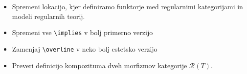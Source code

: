 \documentclass[a4paper]{article}
\begin{document}
    \begin{itemize}
        \item Spremeni lokacijo, kjer definiramo funktorje med regularnimi kategorijami in modeli regularnih teorij.
        \item Spremeni vse \verb|\implies| v bolj primerno verzijo
        \item Zamenjaj \verb|\overline| v neko bolj estetsko verzijo
        \item Preveri definicijo kompozituma dveh morfizmov kategorije $\mathcal{R}(T)$.
    \end{itemize}
\end{document}
